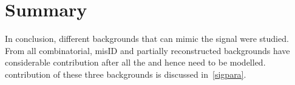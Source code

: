 



\section{Summary}
In conclusion, different backgrounds that can mimic the signal were studied. From all \DIFdelbegin {}\DIFdelend \DIFaddbegin {}\DIFaddend combinatorial, misID and partially reconstructed backgrounds have considerable contribution after all the \DIFdelbegin {}\DIFdelend \DIFaddbegin {}\DIFaddend and hence need to be modelled. \DIFdelbegin {}\DIFdelend \DIFaddbegin {}\DIFaddend contribution of these three backgrounds is discussed in~\autoref{sigpara}.

